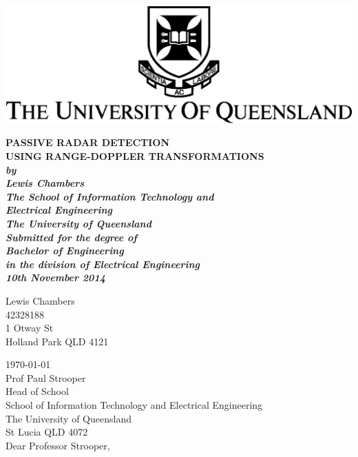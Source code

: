 \documentclass[12pt,openany,a4paper]{book}
\renewcommand{\baselinestretch}{1.2}	%
\begin{document}
\frontmatter

\begin{titlepage}
\renewcommand{\baselinestretch}{1.0}
\begin{center}

\centerline{\includegraphics{UQlogoD_MONO_dos.png}}

\vspace*{35mm}
\Huge\bf
		PASSIVE RADAR DETECTION\\
		USING RANGE-DOPPLER TRANSFORMATIONS\\

\vspace{20mm}
\large\sl
		by\\
		Lewis Chambers
		\medskip\\
\rm
		The School of Information Technology and\\
		Electrical Engineering\\
		The University of Queensland\\
\vspace{30mm}
		Submitted for the degree of\\
		Bachelor of Engineering		
		\smallskip\\
\normalsize
		in the division of Electrical Engineering
		\medskip\\
\large
		10th November 2014
\end{center}
\end{titlepage}

\cleardoublepage

\begin{flushright}
	Lewis Chambers\\
	42328188\\
	1 Otway St\\
	Holland Park QLD 4121\\
	\medskip

\end{flushright}
\begin{flushleft}
  \today \\
  \bigskip\bigskip
  Prof Paul Strooper\\
  Head of School\\
  School of Information Technology and Electrical Engineering\\
  The University of  Queensland\\
  St Lucia QLD 4072\\

  \bigskip\bigskip
  Dear Professor Strooper,
\end{flushleft}
\end{document}

